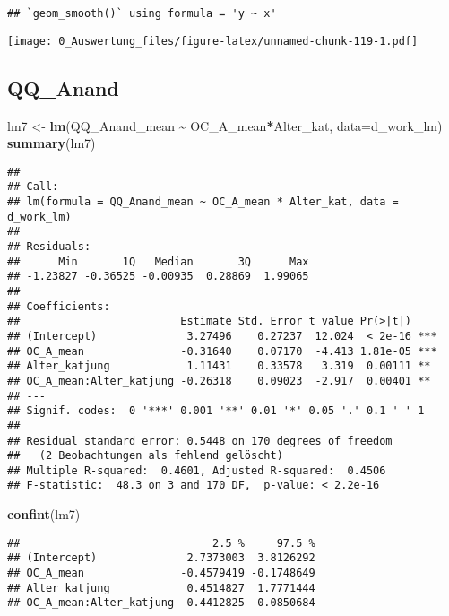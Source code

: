 \documentclass[
]{article}
\newenvironment{Shaded}{\begin{snugshade}}{\end{snugshade}}
\newcommand{\AttributeTok}[1]{\textcolor[rgb]{0.13,0.29,0.53}{#1}}
\newcommand{\FunctionTok}[1]{\textcolor[rgb]{0.13,0.29,0.53}{\textbf{#1}}}
\newcommand{\NormalTok}[1]{#1}
\newcommand{\OtherTok}[1]{\textcolor[rgb]{0.56,0.35,0.01}{#1}}
\newcommand{\SpecialCharTok}[1]{\textcolor[rgb]{0.81,0.36,0.00}{\textbf{#1}}}
\begin{document}
\begin{verbatim}
## `geom_smooth()` using formula = 'y ~ x'
\end{verbatim}

\texttt{[image: 0\_Auswertung\_files/figure-latex/unnamed-chunk-119-1.pdf]}

\subsection{QQ\_Anand}\label{qq_anand}

\begin{Shaded}
\begin{Highlighting}[]
\NormalTok{lm7 }\OtherTok{\textless{}{-}} \FunctionTok{lm}\NormalTok{(QQ\_Anand\_mean }\SpecialCharTok{\textasciitilde{}}\NormalTok{ OC\_A\_mean}\SpecialCharTok{*}\NormalTok{Alter\_kat, }\AttributeTok{data=}\NormalTok{d\_work\_lm)}
\FunctionTok{summary}\NormalTok{(lm7)}
\end{Highlighting}
\end{Shaded}

\begin{verbatim}
## 
## Call:
## lm(formula = QQ_Anand_mean ~ OC_A_mean * Alter_kat, data = d_work_lm)
## 
## Residuals:
##      Min       1Q   Median       3Q      Max 
## -1.23827 -0.36525 -0.00935  0.28869  1.99065 
## 
## Coefficients:
##                         Estimate Std. Error t value Pr(>|t|)    
## (Intercept)              3.27496    0.27237  12.024  < 2e-16 ***
## OC_A_mean               -0.31640    0.07170  -4.413 1.81e-05 ***
## Alter_katjung            1.11431    0.33578   3.319  0.00111 ** 
## OC_A_mean:Alter_katjung -0.26318    0.09023  -2.917  0.00401 ** 
## ---
## Signif. codes:  0 '***' 0.001 '**' 0.01 '*' 0.05 '.' 0.1 ' ' 1
## 
## Residual standard error: 0.5448 on 170 degrees of freedom
##   (2 Beobachtungen als fehlend gelöscht)
## Multiple R-squared:  0.4601, Adjusted R-squared:  0.4506 
## F-statistic:  48.3 on 3 and 170 DF,  p-value: < 2.2e-16
\end{verbatim}

\begin{Shaded}
\begin{Highlighting}[]
\FunctionTok{confint}\NormalTok{(lm7)}
\end{Highlighting}
\end{Shaded}

\begin{verbatim}
##                              2.5 %     97.5 %
## (Intercept)              2.7373003  3.8126292
## OC_A_mean               -0.4579419 -0.1748649
## Alter_katjung            0.4514827  1.7771444
## OC_A_mean:Alter_katjung -0.4412825 -0.0850684
\end{verbatim}
\end{document}
